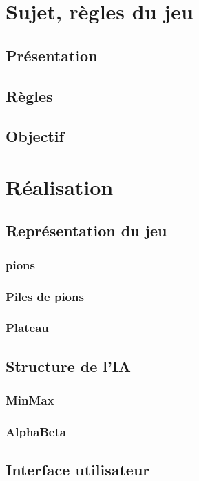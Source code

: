 \documentclass[report, backcover, french, nodocumentinfo]{upmethodology-document}
\begin{document}
	\upmdocumentsummary{}
	\upmdocumentauthors{}
	\upmdocumentinformedpeople{}
	\upmpublicationpage{}
	\tableofcontents{}
	\newpage{}

	\chapter{Sujet, règles du jeu}
		\section{Présentation}
		\section{Règles}
		\section{Objectif}
	\chapter{Réalisation}
		\section{Représentation du jeu}
			\subsection{pions}
			\subsection{Piles de pions}
			\subsection{Plateau}
		\section{Structure de l'IA}
			\subsection{MinMax}
			\subsection{AlphaBeta}
		\section{Interface utilisateur}
\end{document}
